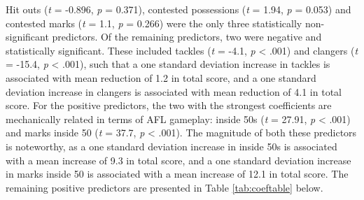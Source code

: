 \documentclass{article}
\begin{document}
Hit outs (\emph{t} = -0.896, \emph{p} = 0.371), contested possessions (\emph{t} = 1.94, \emph{p} = 0.053) and contested marks (\emph{t} = 1.1, \emph{p} = 0.266) were the only three statistically non-significant predictors. Of the remaining predictors, two were negative and statistically significant. These included tackles (\emph{t} = -4.1, \emph{p} \textless{} .001) and clangers (\emph{t} = -15.4, \emph{p} \textless{} .001), such that a one standard deviation increase in tackles is associated with mean reduction of 1.2 in total score, and a one standard deviation increase in clangers is associated with mean reduction of 4.1 in total score. For the positive predictors, the two with the strongest coefficients are mechanically related in terms of AFL gameplay: inside 50s (\emph{t} = 27.91, \emph{p} \textless{} .001) and marks inside 50 (\emph{t} = 37.7, \emph{p} \textless{} .001). The magnitude of both these predictors is noteworthy, as a one standard deviation increase in inside 50s is associated with a mean increase of 9.3 in total score, and a one standard deviation increase in marks inside 50 is associated with a mean increase of 12.1 in total score. The remaining positive predictors are presented in Table \ref{tab:coeftable} below.
\end{document}
